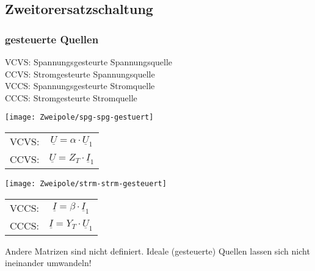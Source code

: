 \subsection{Zweitorersatzschaltung}
\subsubsection{gesteuerte Quellen}
\begin{mdframed}[style=exercise,frametitle=Ideal]
    \footnotesize
    VCVS: Spannungsgesteurte Spannungsquelle\\
    CCVS: Stromgesteurte Spannungsquelle\\
    VCCS: Spannungsgesteurte Stromquelle\\
    CCCS: Stromgesteurte Stromquelle
    \normalsize
    \begin{center}
        \texttt{[image: Zweipole/spg-spg-gestuert]}\\
    \begin{tabular}{l c}
       VCVS:& $\underline{U}=\alpha\cdot \underline{U}_1$\\
       CCVS:& $\underline{U}=Z_T\cdot \underline{I}_1$\\
    \end{tabular}
    \end{center}
    \begin{center}
        \texttt{[image: Zweipole/strm-strm-gesteuert]}\\
    \begin{tabular}{l c}
       VCCS:& $\underline{I}=\beta\cdot \underline{I}_1$\\
       CCCS:& $\underline{I}=Y_T\cdot \underline{U}_1$\\
    \end{tabular}
    \end{center}
    Andere Matrizen sind nicht definiert.  Ideale (gesteuerte) Quellen lassen
    sich nicht ineinander umwandeln!
\end{mdframed}

